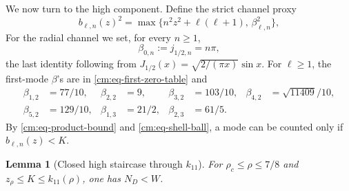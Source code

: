 \documentclass[11pt]{article}
\numberwithin{equation}{section}
\newtheorem{lemma}[theorem]{Lemma}
\theoremstyle{definition}
\theoremstyle{remark}
\begin{document}
We now turn to the high component.  Define the strict channel proxy
\begin{equation}
 b_{\ell,n}(z)^2=
 \max\{n^2z^2+\ell(\ell+1),\,\beta_{\ell,n}^2\},
 \label{cm:eq-channel-proxy}
\end{equation}
For the radial channel we set, for every \(n\geq1\),
\[
 \beta_{0,n}:=j_{1/2,n}=n\pi,
\]
the last identity following from
\(J_{1/2}(x)=\sqrt{2/(\pi x)}\sin x\).  For \(\ell\geq1\), the
first-mode \(\beta\)'s are in
\eqref{cm:eq-first-zero-table} and
\[
\begin{aligned}
 \beta_{1,2}&=77/10,&
 \beta_{2,2}&=9,&
 \beta_{3,2}&=103/10,&
 \beta_{4,2}&=\sqrt{11409}/10,\\
 \beta_{5,2}&=129/10,&
 \beta_{1,3}&=21/2,&
 \beta_{2,3}&=61/5.
\end{aligned}
\]
By \eqref{cm:eq-product-bound} and \eqref{cm:eq-shell-ball}, a mode can
be counted only if \(b_{\ell,n}(z)<K\).

\begin{lemma}[Closed high staircase through \(k_{11}\)]
\label{cm:lem-k11}
For \(\rho_c\leq\rho\leq7/8\) and
\(z_\rho\leq K\leq k_{11}(\rho)\), one has \(N_D<W\).
\end{lemma}
\end{document}
